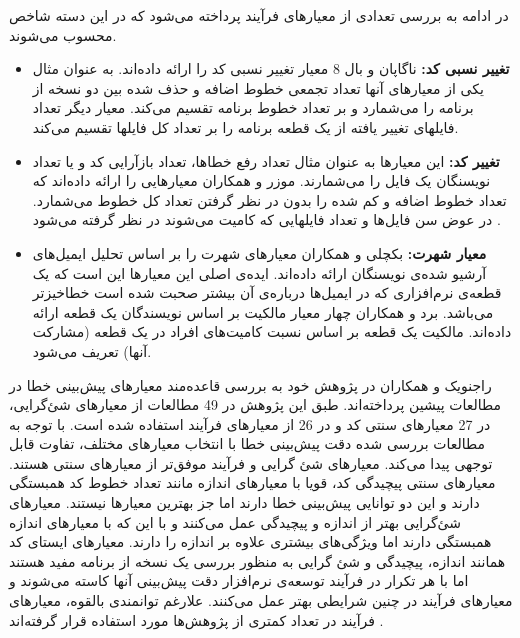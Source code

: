 در ادامه به بررسی تعدادی از معیارهای فرآیند پرداخته می‌شود که در این دسته شاخص محسوب می‌شوند. 
\begin{itemize}
\item \textbf{تغییر نسبی کد: }
ناگاپان و بال 8 معیار تغییر نسبی کد را ارائه داده‌اند\cite{nagappan2005use}. به عنوان مثال یکی از معیار‌های آنها تعداد تجمعی خطوط اضافه و حذف شده بین دو نسخه از برنامه را می‌شمارد و بر تعداد خطوط برنامه تقسیم می‌کند. معیار دیگر تعداد فایلهای تغییر یافته از یک قطعه برنامه را بر تعداد  کل فایلها تقسیم می‌کند. 
\item \textbf{تغییر کد: }
این معیارها به عنوان مثال تعداد رفع خطاها، تعداد بازآرایی کد و یا تعداد نویسنگان یک فایل را می‌شمارند. موزر و همکاران معیارهایی را ارائه داده‌اند که تعداد خطوط اضافه و کم شده را بدون در نظر گرفتن تعداد کل خطوط می‌شمارد. در عوض سن فایل‌ها و تعداد فایلهایی که کامیت می‌شوند در نظر گرفته می‌شود \cite{moser2008comparative}. 
\item \textbf{معیار شهرت: }
 بکچلی و همکاران معیارهای شهرت را بر اساس تحلیل ایمیل‌های آرشیو شده‌ی نویسنگان ارائه داده‌اند. ایده‌ی اصلی این معیارها این است که یک قطعه‌ی  نرم‌افزاری که در ایمیل‌ها درباره‌ی آن بیشتر صحبت شده است خطاخیزتر می‌باشد\cite{bacchelli2010popular}. برد و همکاران چهار معیار مالکیت بر اساس نویسندگان یک قطعه ارائه داده‌اند. مالکیت یک قطعه بر اساس نسبت کامیت‌های  افراد  در یک قطعه (مشارکت آنها) تعریف می‌شود. \\
\end{itemize}


راجنویک و همکاران در پژوهش خود به بررسی قاعده‌مند معیارهای پیش‌بینی خطا در مطالعات پیشین پرداخته‌اند.  طبق این پژوهش در 49\lr{\%} مطالعات از معیارهای شئ‌گرایی، در 27\lr{\%} معیارهای سنتی کد و در 26 \lr{\%} از معیارهای فرآیند استفاده شده است. با توجه به مطالعات بررسی شده دقت پیش‌بینی خطا  با انتخاب معیارهای مختلف، تفاوت قابل توجهی  پیدا می‌کند. معیارهای شئ گرایی و فرآیند موفق‌تر از معیارهای سنتی هستند. معیارهای سنتی  پیچیدگی کد، قویا با معیارهای اندازه مانند تعداد خطوط کد همبستگی دارند و این دو توانایی پیش‌بینی خطا دارند اما جز بهترین معیارها نیستند. معیارهای شئ‌گرایی بهتر از اندازه و پیچیدگی عمل می‌کنند و با این که با معیارهای اندازه همبستگی دارند اما ویژگی‌های بیشتری علاوه بر اندازه را دارند. معیارهای ایستای کد همانند اندازه، پیچیدگی و شئ گرایی به منظور بررسی یک نسخه از برنامه مفید هستند اما با هر تکرار در فرآیند توسعه‌ی نرم‌افزار دقت پیش‌بینی آنها کاسته می‌شوند و معیارهای فرآیند در چنین شرایطی بهتر عمل می‌کنند. علارغم توانمندی بالقوه، معیارهای فرآیند در تعداد کمتری از پژوهش‌ها مورد استفاده قرار گرفته‌اند \cite{radjenovic2013software}. \\
 
